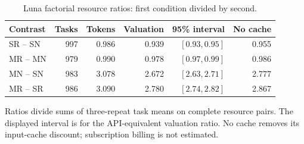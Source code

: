 \begin{table}[htbp]\centering\small
\caption{Luna factorial resource ratios: first condition divided by second.}
\label{tab:scale-resources}
\begin{tabular}{lrrrrr}\toprule
Contrast & Tasks & Tokens & Valuation & 95\% interval & No cache\\\midrule
SR -- SN & 997 & 0.986 & 0.939 & $[0.93, 0.95]$ & 0.955\\
MR -- MN & 979 & 0.990 & 0.978 & $[0.97, 0.99]$ & 0.986\\
MN -- SN & 983 & 3.078 & 2.672 & $[2.63, 2.71]$ & 2.777\\
MR -- SR & 986 & 3.090 & 2.780 & $[2.74, 2.82]$ & 2.867\\
\bottomrule\end{tabular}
\par\smallskip\noindent Ratios divide sums of three-repeat task means on complete resource pairs. The displayed interval is for the API-equivalent valuation ratio. No cache removes its input-cache discount; subscription billing is not estimated.
\end{table}
